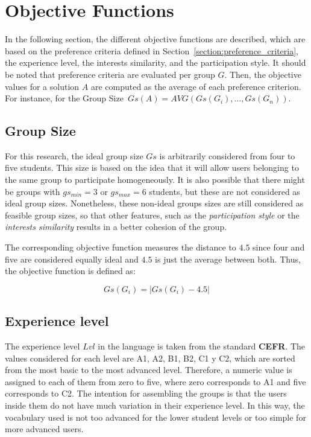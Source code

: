 \section{Objective Functions} 
\label{section:objective_functions}

In the following section, the different objective functions are described, which are based on the preference criteria defined in Section~\ref{section:preference_criteria}, the experience level, the interests similarity, and the participation style. It should be noted that preference criteria are evaluated per group $G$. Then, the objective values for a solution $A$ are computed as the average of each preference criterion. For instance, for the Group Size~$Gs(A) = AVG(Gs(G_i),\dots,Gs(G_n))$.\

\subsection{Group Size}
\label{subsection:group_size}

For this research, the ideal group size $Gs$ is arbitrarily considered from four to five students. This size is based on the idea that it will allow users belonging to the same group to participate homogeneously. It is also possible that there might be groups with $gs_{min} = 3$ or $gs_{max} = 6$ students, but these are not considered as ideal group sizes. Nonetheless, these non-ideal groups sizes are still considered as feasible group sizes, so that other features, such as the \textit{participation style} or the \textit{interests similarity} results in a better cohesion of the group.\

The corresponding objective function measures the distance to $4.5$ since four and five are considered equally ideal and $4.5$ is just the average between both. Thus, the objective function is defined as:

\begin{equation} \label{eq_group_size}
    Gs(G_i) = | Gs(G_i) - 4.5 |
\end{equation}

\subsection{Experience level}
\label{subsection:experience_level}

The experience level $Lvl$ in the language is taken from the standard \textbf{CEFR}. The values considered for each level are A1, A2, B1, B2, C1 y C2, which are sorted from the most basic to the most advanced level. Therefore, a numeric value is assigned to each of them from zero to five, where zero corresponds to A1 and five corresponds to C2. The intention for assembling the groups is that the users inside them do not have much variation in their experience level. 
In this way, the vocabulary used is not too advanced for the lower student levels or too simple for more advanced users. 

